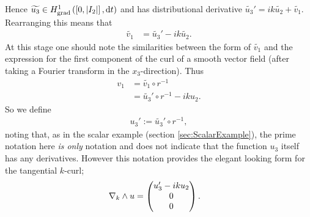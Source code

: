 Hence $\widetilde{u_3}\in H^1_\mathrm{grad}\left( \left[ 0,\lvert I_2 \rvert \right], \mathrm{d}t \right)$ and has distributional derivative $\widetilde{u_3}' = ik\widetilde{u_2} + \widetilde{v_1}$.
Rearranging this means that 
\begin{align*}
\widetilde{v_1} &= \widetilde{u_3}' - ik\widetilde{u_2}.
\end{align*}
At this stage one should note the similarities between the form of $\widetilde{v_1}$ and the expression for the first component of the curl of a smooth vector field (after taking a Fourier transform in the $x_3$-direction).
Thus 
\begin{align*}
	v_1 &= \widetilde{v_1}\circ r^{-1} \\
	&= \widetilde{u_3}'\circ r^{-1} - iku_2.
\end{align*}
So we define
\begin{align*}
	u_3' := \widetilde{u_3}'\circ r^{-1},
\end{align*}
noting that, as in the scalar example (section \ref{sec:ScalarExample}), the prime notation here \textit{is only} notation and does not indicate that the function $u_3$ itself has any derivatives.
However this notation provides the elegant looking form for the tangential $k$-curl;
\begin{align*}
	\nabla_{k}\wedge u &= \begin{pmatrix} u_3^{\prime} - iku_2 \\ 0 \\ 0 \end{pmatrix}.
\end{align*}

